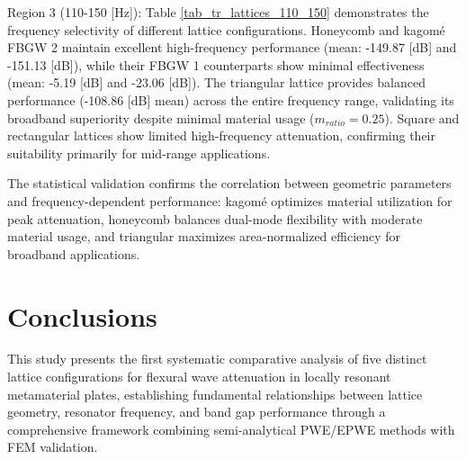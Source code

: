\documentclass[review,numbers,sort&compress]{elsarticle}
\begin{document}
Region 3 (110-150 [Hz]): Table \ref{tab_tr_lattices_110_150} demonstrates the frequency selectivity of different lattice configurations. Honeycomb and kagomé FBGW 2 maintain excellent high-frequency performance (mean: -149.87 [dB] and -151.13 [dB]), while their FBGW 1 counterparts show minimal effectiveness (mean: -5.19 [dB] and -23.06 [dB]). The triangular lattice provides balanced performance (-108.86 [dB] mean) across the entire frequency range, validating its broadband superiority despite minimal material usage ($m_{ratio} = 0.25$). Square and rectangular lattices show limited high-frequency attenuation, confirming their suitability primarily for mid-range applications.

The statistical validation confirms the correlation between geometric parameters and frequency-dependent performance: kagomé optimizes material utilization for peak attenuation, honeycomb balances dual-mode flexibility with moderate material usage, and triangular maximizes area-normalized efficiency for broadband applications.

\section{Conclusions}\label{Conc}

This study presents the first systematic comparative analysis of five distinct lattice configurations for flexural wave attenuation in locally resonant metamaterial plates, establishing fundamental relationships between lattice geometry, resonator frequency, and band gap performance through a comprehensive framework combining semi-analytical PWE/EPWE methods with FEM validation.
\end{document}
